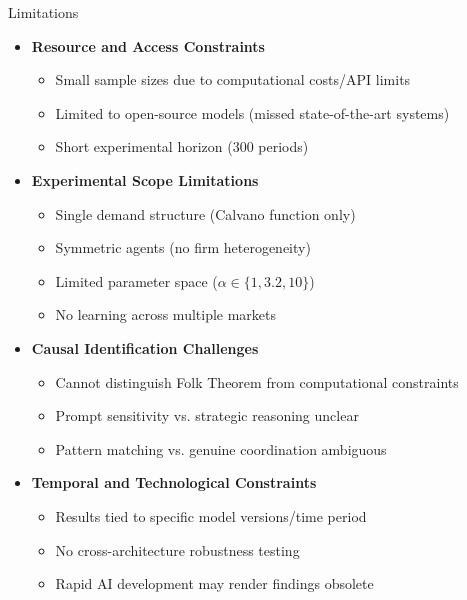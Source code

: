 \documentclass[10pt, aspectratio=169]{beamer}
\begin{document}
\begin{frame}{Limitations}
    \begin{itemize}
    \item \textbf{Resource and Access Constraints}
    \begin{itemize}
        \item Small sample sizes due to computational costs/API limits
        \item Limited to open-source models (missed state-of-the-art systems)
        \item Short experimental horizon (300 periods)
    \end{itemize}
    
    \item \textbf{Experimental Scope Limitations}
    \begin{itemize}
        \item Single demand structure (Calvano function only)
        \item Symmetric agents (no firm heterogeneity)
        \item Limited parameter space ($\alpha \in \{1, 3.2, 10\}$)
        \item No learning across multiple markets
    \end{itemize}
    
    \item \textbf{Causal Identification Challenges}
    \begin{itemize}
        \item Cannot distinguish Folk Theorem from computational constraints
        \item Prompt sensitivity vs. strategic reasoning unclear
        \item Pattern matching vs. genuine coordination ambiguous
    \end{itemize}
    
    \item \textbf{Temporal and Technological Constraints}
    \begin{itemize}
        \item Results tied to specific model versions/time period
        \item No cross-architecture robustness testing
        \item Rapid AI development may render findings obsolete
    \end{itemize}
    \end{itemize}
\end{frame}
\end{document}
